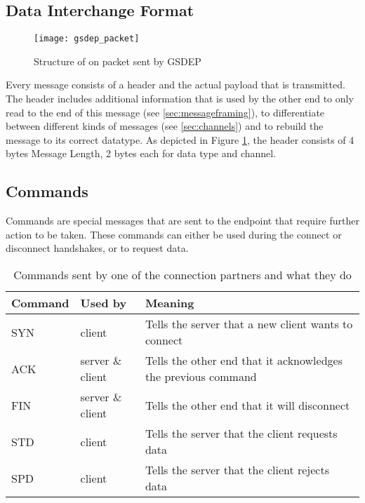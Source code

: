 \subsection{Data Interchange Format}

\begin{figure}[H]
	\centering
	\texttt{[image: gsdep\_packet]}
	\caption{Structure of on packet sent by GSDEP}
	\label{fig:packet}
\end{figure}

Every message consists of a header and the actual payload that is transmitted. The header includes additional information that is used by the other end to only read to the end of this message (see \ref{sec:messageframing}), to differentiate between different kinds of messages (see \ref{sec:channels}) and to rebuild the message to its correct datatype. As depicted in Figure \ref{fig:packet}, the header consists of 4 bytes Message Length, 2 bytes each for data type and channel.

\subsection{Commands}

Commands are special messages that are sent to the endpoint that require further action to be taken. These commands can either be used during the connect or disconnect handshakes, or to request data.

\begin{table}[H]
	\centering
	\begin{tabular}{| l | l | p{5cm} |}
	\hline
	\textbf{Command} & \textbf{Used by} & \textbf{Meaning} \\ \hline
	SYN & client & Tells the server that a new client wants to connect \\ \hline
	ACK & server \& client & Tells the other end that it acknowledges the previous command \\ \hline
	FIN & server \& client & Tells the other end that it will disconnect \\ \hline
	STD & client & Tells the server that the client requests data\\ \hline
	SPD & client & Tells the server that the client rejects data\\
	\hline
	\end{tabular}
	\caption{Commands sent by one of the connection partners and what they do}
	\label{tab:commands}
\end{table}

